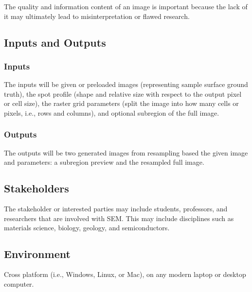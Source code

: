 \documentclass{article}
\begin{document}
The quality and information content of an image is important because the lack of
it may ultimately lead to misinterpretation or flawed research.

\subsection{Inputs and Outputs}
\subsubsection{Inputs}
The inputs will be given or preloaded images (representing sample surface
ground truth), the spot profile (shape and relative size with respect to the
output pixel or cell size), the raster grid parameters (split the image into how
many cells or pixels, i.e., rows and columns), and optional subregion of the
full image.
\subsubsection{Outputs} The outputs will be two generated images
from resampling based the given image and parameters: a subregion preview and
the resampled full image.

\subsection{Stakeholders}
The stakeholder or interested parties may include
students, professors, and researchers that are involved with SEM. This may
include disciplines such as materials science, biology, geology, and
semiconductors.

\subsection{Environment}
Cross platform (i.e., Windows, Linux, or Mac), 
on any modern laptop or desktop computer.
\end{document}
